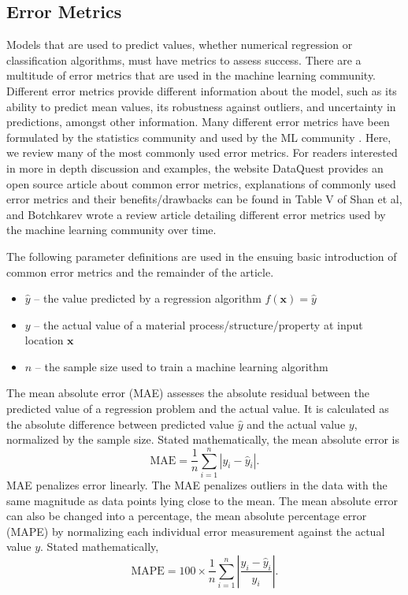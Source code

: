 \subsection{Error Metrics}\label{errormetrics}
Models that are used to predict values, whether numerical regression or classification algorithms, must have metrics to assess success. There are a multitude of error metrics that are used in the machine learning community. Different error metrics provide different information about the model, such as its ability to predict mean values, its robustness against outliers, and uncertainty in predictions, amongst other information. Many different error metrics have been formulated by the statistics community and used by the ML community \cite{Navidi2006}. Here, we review many of the most commonly used error metrics. For readers interested in more in depth discussion and examples, the website DataQuest provides an open source article about common error metrics\cite{DataQuestError}, explanations of commonly used error metrics and their benefits/drawbacks can be found in Table V of Shan et al\cite{Shan2010}, and Botchkarev wrote a review article detailing different error metrics used by the machine learning community over time\cite{Botchkarev}.

The following parameter definitions are used in the ensuing basic introduction of common error metrics and the remainder of the article.
\begin{itemize}
	\item $\hat y$ -- the value predicted by a regression algorithm $f(\mathbf{x}) = \hat y$
	\item $y$ -- the actual value of a material process/structure/property at input location $\mathbf{x}$
	\item $n$ -- the sample size used to train a machine learning algorithm
\end{itemize}

The mean absolute error (MAE) assesses the absolute residual between the predicted value of a regression problem and the actual value. It is calculated as the absolute difference between predicted value $\hat y$ and the actual value $y$, normalized by the sample size. Stated mathematically, the mean absolute error is 
\begin{equation}
	\text{MAE} = \frac{1}{n} \sum_{i=1}^n \left|y_i - \hat y_i \right|.
	\label{MAE}
\end{equation}
MAE penalizes error linearly. The MAE penalizes outliers in the data with the same magnitude as data points lying close to the mean. The mean absolute error can also be changed into a percentage, the mean absolute percentage error (MAPE) by normalizing each individual error measurement against the actual value $y$. Stated mathematically, 
\begin{equation}
	\text{MAPE} = 100 \times \frac{1}{n} \sum_{i=1}^n \left|\frac{y_i - \hat y_i}{y_i}\right|.
	\label{MAPE}
\end{equation}

